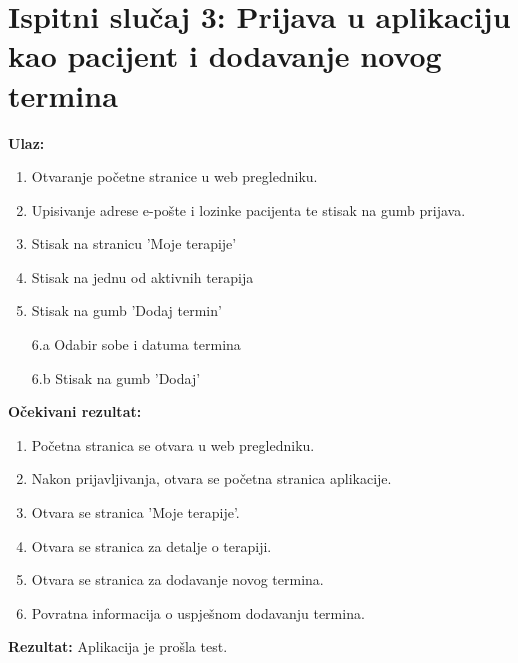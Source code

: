 \section*{Ispitni slučaj 3: Prijava u aplikaciju kao pacijent i dodavanje novog termina}
\textbf{Ulaz:}
\begin{enumerate}[label=\arabic*.]
    \item Otvaranje početne stranice u web pregledniku.
    \item Upisivanje adrese e-pošte i lozinke pacijenta te stisak na gumb prijava.
    \item Stisak na stranicu 'Moje terapije'
    \item Stisak na jednu od aktivnih terapija
    \item Stisak na gumb 'Dodaj termin'
    \item[6.a] Odabir sobe i datuma termina
    \item[6.b] Stisak na gumb 'Dodaj'
\end{enumerate}
\textbf{Očekivani rezultat:}
\begin{enumerate}[label=\arabic*.]
    \item Početna stranica se otvara u web pregledniku.
    \item Nakon prijavljivanja, otvara se početna stranica aplikacije.
    \item Otvara se stranica 'Moje terapije'.
    \item Otvara se stranica za detalje o terapiji.
    \item Otvara se stranica za dodavanje novog termina.
    \item Povratna informacija o uspješnom dodavanju termina.
\end{enumerate}
\textbf{Rezultat:} Aplikacija je prošla test.

